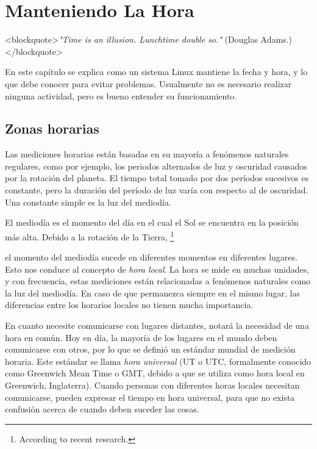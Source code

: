 ﻿\chapter{
Manteniendo La Hora}

<blockquote>\textit{"Time is an illusion. Lunchtime double so."} (Douglas Adams.)</blockquote>


En este capítulo se explica como un sistema Linux mantiene la fecha y hora,
y lo que debe conocer para evitar problemas.
Usualmente no es necesario realizar
ninguna actividad, pero es bueno entender su funcionamiento.


\section{
Zonas horarias}

Las mediciones horarias están basadas en su mayoría a fenómenos naturales regulares,
como por ejemplo, los periodos alternados de luz y oscuridad
causados por la rotación del planeta. El tiempo total tomado por dos períodos
sucesivos es constante, pero la duración del período de luz varía
con respecto al de oscuridad. Una constante simple es la luz del mediodía.



El mediodía es el momento del día en el cual el Sol se encuentra en la posición más alta. 
Debido a la rotación de la Tierra,
		\footnote{According to
		recent research.}

 el momento del mediodía sucede en diferentes 
momentos en diferentes lugares. Esto nos conduce al concepto de \textit{hora local}.
La hora se mide en muchas unidades, y con frecuencia, estas
mediciones están relacionadas a fenómenos naturales como la luz del mediodía.
En caso de que permanezca siempre en el mismo lugar, las diferencias entre los
horarios locales no tienen mucha importancia.



En cuanto necesite comunicarse con lugares distantes, notará la necesidad de una
hora en común. Hoy en día, la mayoría de los lugares en el mundo deben
comunicarse con otros, por lo que se definió un estándar mundial de medición
horaria. Este estándar se llama \textit{hora universal} (UT o UTC, formalmente
conocido como Greenwich Mean Time o GMT, debido a que se utiliza como hora
local en Greenwich, Inglaterra). Cuando personas con diferentes horas locales
necesitan comunicarse, pueden expresar el tiempo en hora universal,
para que no exista confusión acerca de cuando deben suceder las cosas.



